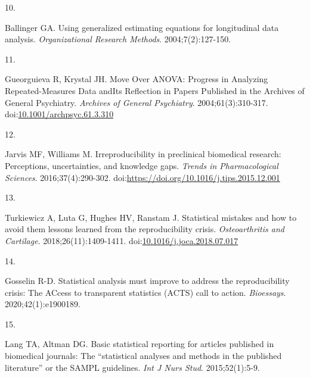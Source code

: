 \documentclass[
]{article}
\newlength{\cslhangindent}
\newlength{\csllabelwidth}
\newlength{\cslentryspacingunit} %
\newenvironment{CSLReferences}[2] %
 {%
  \setlength{\parindent}{0pt}
  \ifodd #1
  \let\oldpar\par
  \def\par{\hangindent=\cslhangindent\oldpar}
  \fi
  \setlength{\parskip}{#2\cslentryspacingunit}
 }%
 {}
\newcommand{\CSLLeftMargin}[1]{\parbox[t]{\csllabelwidth}{#1}}
\newcommand{\CSLRightInline}[1]{\parbox[t]{\linewidth - \csllabelwidth}{#1}\break}
\begin{document}
\begin{CSLReferences}{0}{0}
\leavevmode{}%
\CSLLeftMargin{10. }%
\CSLRightInline{Ballinger GA. Using generalized estimating equations for
longitudinal data analysis. \emph{Organizational Research Methods}.
2004;7(2):127-150.}

\leavevmode{}%
\CSLLeftMargin{11. }%
\CSLRightInline{Gueorguieva R, Krystal JH. {Move Over ANOVA: Progress in
Analyzing Repeated-Measures Data andIts Reflection in Papers Published
in the Archives of General Psychiatry}. \emph{Archives of General
Psychiatry}. 2004;61(3):310-317.
doi:\href{https://doi.org/10.1001/archpsyc.61.3.310}{10.1001/archpsyc.61.3.310}}

\leavevmode{}%
\CSLLeftMargin{12. }%
\CSLRightInline{Jarvis MF, Williams M. Irreproducibility in preclinical
biomedical research: Perceptions, uncertainties, and knowledge gaps.
\emph{Trends in Pharmacological Sciences}. 2016;37(4):290-302.
doi:\url{https://doi.org/10.1016/j.tips.2015.12.001}}

\leavevmode{}%
\CSLLeftMargin{13. }%
\CSLRightInline{Turkiewicz A, Luta G, Hughes HV, Ranstam J. Statistical
mistakes and how to avoid them {\textendash} lessons learned from the
reproducibility crisis. \emph{Osteoarthritis and Cartilage}.
2018;26(11):1409-1411.
doi:\href{https://doi.org/10.1016/j.joca.2018.07.017}{10.1016/j.joca.2018.07.017}}

\leavevmode{}%
\CSLLeftMargin{14. }%
\CSLRightInline{Gosselin R-D. Statistical analysis must improve to
address the reproducibility crisis: The {ACcess} to transparent
statistics ({ACTS}) call to action. \emph{Bioessays}.
2020;42(1):e1900189.}

\leavevmode{}%
\CSLLeftMargin{15. }%
\CSLRightInline{Lang TA, Altman DG. Basic statistical reporting for
articles published in biomedical journals: The {``statistical analyses
and methods in the published literature''} or the {SAMPL} guidelines.
\emph{Int J Nurs Stud}. 2015;52(1):5-9.}

\end{CSLReferences}
\end{document}
